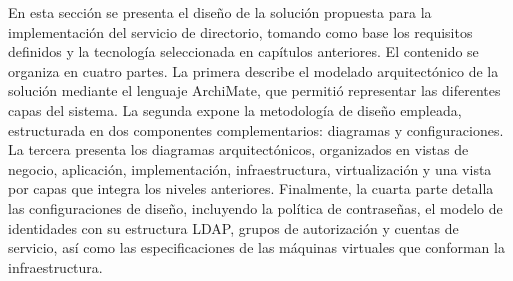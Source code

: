\label{cap:disenio-solucion}
\vspace*{0.7cm}

En esta sección se presenta el diseño de la solución propuesta para la implementación del servicio de directorio, tomando como base los requisitos definidos y la tecnología seleccionada en capítulos anteriores. El contenido se organiza en cuatro partes. La primera describe el modelado arquitectónico de la solución mediante el lenguaje ArchiMate, que permitió representar las diferentes capas del sistema. La segunda expone la metodología de diseño empleada, estructurada en dos componentes complementarios: diagramas y configuraciones. La tercera presenta los diagramas arquitectónicos, organizados en vistas de negocio, aplicación, implementación, infraestructura, virtualización y una vista por capas que integra los niveles anteriores. Finalmente, la cuarta parte detalla las configuraciones de diseño, incluyendo la política de contraseñas, el modelo de identidades con su estructura LDAP, grupos de autorización y cuentas de servicio, así como las especificaciones de las máquinas virtuales que conforman la infraestructura.





